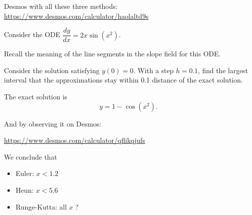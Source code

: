 
\begin{slide}




Desmos with all these three methods:
\hfil 
\url{https://www.desmos.com/calculator/haolaltd9s}


Consider the ODE $\dfrac{dy}{dx} = 2x\sin(x^2)$.
\begin{parts}
	\item Recall the meaning of the line segments in the slope field for this ODE.

	\item Consider the solution satisfying $y(0)=0$. With a step $h=0.1$, find the largest interval that the approximations stay within 0.1 distance of the exact solution.

\end{parts}

	
\end{slide}




\begin{solution}
\begin{slide}

The exact solution is 
\[
y = 1 - \cos(x^2).
\]

And by observing it on Desmos: 
\begin{center}
	\url{https://www.desmos.com/calculator/qflikqjufs}
\end{center}

We conclude that
\begin{itemize}
	\item Euler: $x< 1.2$
	\item Heun: $x < 5.6$
	\item Runge-Kutta: all $x$ ?
\end{itemize}
	
\end{slide}
	
\end{solution}




